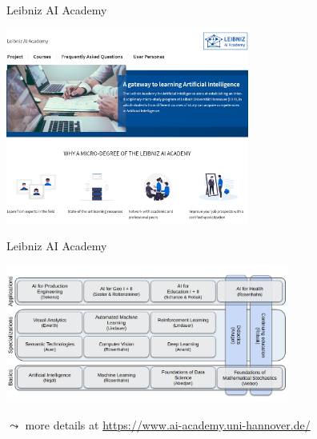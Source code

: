 \documentclass[aspectratio=169]{../latex_main/tntbeamer}  %
\begin{document}
\begin{frame}{Leibniz AI Academy}
    
    \centering
    \vspace{-2em}
    \includegraphics[width=0.6\textwidth]{images/laa.png}

\end{frame}
\begin{frame}{Leibniz AI Academy}
    
    \centering
    \includegraphics[width=0.7\textwidth]{images/LAI-New-Blue.png}

    $\leadsto$ more details at \url{https://www.ai-academy.uni-hannover.de/}

\end{frame}
\end{document}
